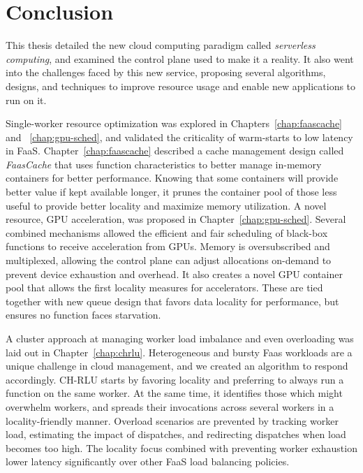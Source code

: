 \section{Conclusion}
\label{sec:conclusion}

This thesis detailed the new cloud computing paradigm called \textit{serverless computing}, and examined the control plane used to make it a reality.
It also went into the challenges faced by this new service, proposing several algorithms, designs, and techniques to improve resource usage and enable new applications to run on it.

Single-worker resource optimization was explored in Chapters~\ref{chap:faascache} and ~\ref{chap:gpu-sched}, and validated the criticality of warm-starts to low latency in FaaS.
Chapter~\ref{chap:faascache} described a cache management design called \emph{FaasCache} that uses function characteristics to better manage in-memory containers for better performance.
Knowing that some containers will provide better value if kept available longer, it prunes the container pool of those less useful to provide better locality and maximize memory utilization.
A novel resource, GPU acceleration, was proposed in Chapter~\ref{chap:gpu-sched}.
Several combined mechanisms allowed the efficient and fair scheduling of black-box functions to receive acceleration from GPUs.
Memory is oversubscribed and multiplexed, allowing the control plane can adjust allocations on-demand to prevent device exhaustion and overhead.
It also creates a novel GPU container pool that allows the first locality measures for accelerators.
These are tied together with new queue design that favors data locality for performance, but ensures no function faces starvation.

A cluster approach at managing worker load imbalance and even overloading was laid out in Chapter~\ref{chap:chrlu}.
Heterogeneous and bursty Faas workloads are a unique challenge in cloud management, and we created an algorithm to respond accordingly.
CH-RLU starts by favoring locality and preferring to always run a function on the same worker.
At the same time, it identifies those which might overwhelm workers, and spreads their invocations across several workers in a locality-friendly manner.
Overload scenarios are prevented by tracking worker load, estimating the impact of dispatches, and redirecting dispatches when load becomes too high.
The locality focus combined with preventing worker exhaustion lower latency significantly over other FaaS load balancing policies.

